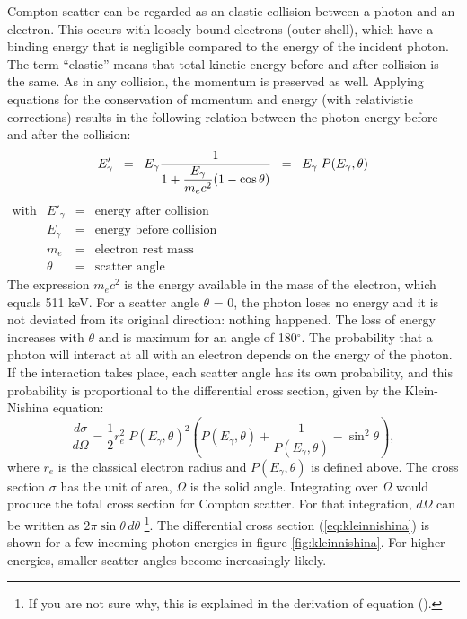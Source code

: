Compton scatter can be regarded as an elastic collision between a
photon and an electron. This occurs with loosely bound electrons
(outer shell), which have a binding energy that is negligible compared
to the energy of the incident photon. The term ``elastic'' means that
total kinetic energy before and after collision is the same. As in any
collision, the momentum is preserved as well. Applying equations for
the conservation of momentum and energy (with relativistic
corrections) results in the following relation between the photon
energy before and after the collision:
\begin{equation}
  E'_\gamma \;\;=\;\; E_\gamma \frac{1}{1 
     + {\displaystyle\frac{E_\gamma}{m_e c^2}} (1 - \cos\theta)} \label{eq:jn_compton_energy}
   \;\; = \;\; E_\gamma \; P(E_\gamma, \theta)
\end{equation}
%
$\begin{array}{llrl}
\mbox{with}
            & E'_\gamma & = & \mbox{energy after collision}\\
            & E_\gamma  & = & \mbox{energy before collision}\\
            & m_e       & = & \mbox{electron rest mass}\\
            & \theta    & = & \mbox{scatter angle}
\end{array}$\\
%
The expression $m_e c^2$ is the energy available in the mass of the
electron, which equals 511 keV. For a scatter angle $\theta$ = 0, the
photon loses no energy and it is not deviated from its original
direction: nothing happened.  The loss of energy increases with
$\theta$ and is maximum for an angle of 180$^{\circ}$. The probability
that a photon will interact at all with an electron depends on the
energy of the photon. If the interaction takes place, each scatter
angle has its own probability, and this probability is proportional to
the differential cross section, given by the Klein-Nishina equation:
\begin{equation}
 \frac{d\sigma}{d\Omega} = \frac{1}{2} r_e^2 \; P(E_\gamma, \theta)^2
    \left( P(E_\gamma, \theta) + \frac{1}{P(E_\gamma, \theta)} - \sin^2\theta \right),
    \label{eq:kleinnishina}
\end{equation}
where $r_e$ is the classical electron radius and $P(E_\gamma, \theta)$
is defined above. The cross section $\sigma$ has the unit of area,
$\Omega$ is the solid angle. Integrating over $\Omega$
would produce the total cross section for Compton scatter. For that
integration, $d\Omega$ can be written as $2 \pi \sin\theta \,d\theta$
\footnote{If you are not sure why, this is explained in the derivation
  of equation ().}.
The differential cross section (\ref{eq:kleinnishina}) is shown for a
few incoming photon energies in figure \ref{fig:kleinnishina}. For
higher energies, smaller scatter angles become increasingly likely.

